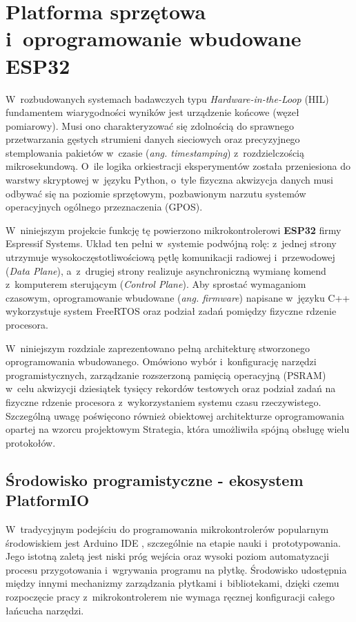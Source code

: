 \chapter{Platforma sprzętowa i~oprogramowanie wbudowane ESP32}
\label{ch:platforma_sprzetowa}

W~rozbudowanych systemach badawczych typu \textit{Hardware-in-the-Loop} (HIL) fundamentem wiarygodności wyników jest urządzenie końcowe (węzeł pomiarowy).
Musi ono charakteryzować się zdolnością do sprawnego przetwarzania gęstych strumieni danych sieciowych oraz precyzyjnego stemplowania pakietów w~czasie (\textit{ang. timestamping}) z~rozdzielczością mikrosekundową.
O~ile logika orkiestracji eksperymentów została przeniesiona do warstwy skryptowej w~języku Python, o~tyle fizyczna akwizycja danych musi odbywać się na poziomie sprzętowym, pozbawionym narzutu systemów operacyjnych ogólnego przeznaczenia (GPOS).

W~niniejszym projekcie funkcję tę powierzono mikrokontrolerowi \textbf{ESP32} firmy Espressif Systems.
Układ ten pełni w~systemie podwójną rolę: z~jednej strony utrzymuje wysokoczęstotliwościową pętlę komunikacji radiowej i~przewodowej (\textit{Data Plane}), a~z~drugiej strony realizuje asynchroniczną wymianę komend z~komputerem sterującym (\textit{Control Plane}).
Aby sprostać wymaganiom czasowym, oprogramowanie wbudowane (\textit{ang. firmware}) napisane w~języku C++ wykorzystuje system FreeRTOS oraz podział zadań pomiędzy fizyczne rdzenie procesora.

W~niniejszym rozdziale zaprezentowano pełną architekturę stworzonego oprogramowania wbudowanego.
Omówiono wybór i~konfigurację narzędzi programistycznych, zarządzanie rozszerzoną pamięcią operacyjną (PSRAM) w~celu akwizycji dziesiątek tysięcy rekordów testowych oraz podział zadań na fizyczne rdzenie procesora z~wykorzystaniem systemu czasu rzeczywistego.
Szczególną uwagę poświęcono również obiektowej architekturze oprogramowania opartej na wzorcu projektowym Strategia, która umożliwiła spójną obsługę wielu protokołów.

\section{Środowisko programistyczne - ekosystem PlatformIO}
\label{sec:ekosystem_platformio}

W~tradycyjnym podejściu do programowania mikrokontrolerów popularnym środowiskiem jest Arduino IDE \cite{arduino_ide}, szczególnie na etapie nauki i~prototypowania.
Jego istotną zaletą jest niski próg wejścia oraz wysoki poziom automatyzacji procesu przygotowania i~wgrywania programu na płytkę.
Środowisko udostępnia między innymi mechanizmy zarządzania płytkami i~bibliotekami, dzięki czemu rozpoczęcie pracy z~mikrokontrolerem nie wymaga ręcznej konfiguracji całego łańcucha narzędzi.

